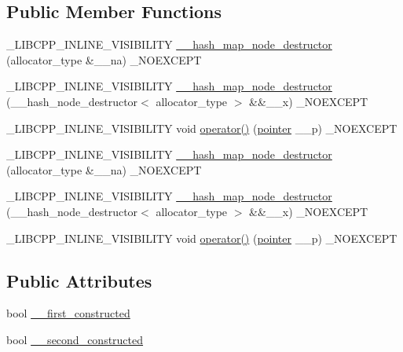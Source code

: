 \subsection*{Public Member Functions}
\begin{DoxyCompactItemize}
\item 
\+\_\+\+L\+I\+B\+C\+P\+P\+\_\+\+I\+N\+L\+I\+N\+E\+\_\+\+V\+I\+S\+I\+B\+I\+L\+I\+T\+Y \hyperlink{class____hash__map__node__destructor_ae769d8f8dd5d8206256a8da948c70246}{\+\_\+\+\_\+hash\+\_\+map\+\_\+node\+\_\+destructor} (allocator\+\_\+type \&\+\_\+\+\_\+na) \+\_\+\+N\+O\+E\+X\+C\+E\+P\+T
\item 
\+\_\+\+L\+I\+B\+C\+P\+P\+\_\+\+I\+N\+L\+I\+N\+E\+\_\+\+V\+I\+S\+I\+B\+I\+L\+I\+T\+Y \hyperlink{class____hash__map__node__destructor_ae34ea0c4c78b256cabbb8a0cf70cddd9}{\+\_\+\+\_\+hash\+\_\+map\+\_\+node\+\_\+destructor} (\+\_\+\+\_\+hash\+\_\+node\+\_\+destructor$<$ allocator\+\_\+type $>$ \&\&\+\_\+\+\_\+x) \+\_\+\+N\+O\+E\+X\+C\+E\+P\+T
\item 
\+\_\+\+L\+I\+B\+C\+P\+P\+\_\+\+I\+N\+L\+I\+N\+E\+\_\+\+V\+I\+S\+I\+B\+I\+L\+I\+T\+Y void \hyperlink{class____hash__map__node__destructor_a000375b0a0b2f469818005bea5db02ee}{operator()} (\hyperlink{class____hash__map__node__destructor_a17f355285c7ac0618f1acb9b8a886890}{pointer} \+\_\+\+\_\+p) \+\_\+\+N\+O\+E\+X\+C\+E\+P\+T
\item 
\+\_\+\+L\+I\+B\+C\+P\+P\+\_\+\+I\+N\+L\+I\+N\+E\+\_\+\+V\+I\+S\+I\+B\+I\+L\+I\+T\+Y \hyperlink{class____hash__map__node__destructor_ae769d8f8dd5d8206256a8da948c70246}{\+\_\+\+\_\+hash\+\_\+map\+\_\+node\+\_\+destructor} (allocator\+\_\+type \&\+\_\+\+\_\+na) \+\_\+\+N\+O\+E\+X\+C\+E\+P\+T
\item 
\+\_\+\+L\+I\+B\+C\+P\+P\+\_\+\+I\+N\+L\+I\+N\+E\+\_\+\+V\+I\+S\+I\+B\+I\+L\+I\+T\+Y \hyperlink{class____hash__map__node__destructor_ae34ea0c4c78b256cabbb8a0cf70cddd9}{\+\_\+\+\_\+hash\+\_\+map\+\_\+node\+\_\+destructor} (\+\_\+\+\_\+hash\+\_\+node\+\_\+destructor$<$ allocator\+\_\+type $>$ \&\&\+\_\+\+\_\+x) \+\_\+\+N\+O\+E\+X\+C\+E\+P\+T
\item 
\+\_\+\+L\+I\+B\+C\+P\+P\+\_\+\+I\+N\+L\+I\+N\+E\+\_\+\+V\+I\+S\+I\+B\+I\+L\+I\+T\+Y void \hyperlink{class____hash__map__node__destructor_a000375b0a0b2f469818005bea5db02ee}{operator()} (\hyperlink{class____hash__map__node__destructor_a17f355285c7ac0618f1acb9b8a886890}{pointer} \+\_\+\+\_\+p) \+\_\+\+N\+O\+E\+X\+C\+E\+P\+T
\end{DoxyCompactItemize}
\subsection*{Public Attributes}
\begin{DoxyCompactItemize}
\item 
bool \hyperlink{class____hash__map__node__destructor_aca6510f2ab38d2127b39e734f98114bd}{\+\_\+\+\_\+first\+\_\+constructed}
\item 
bool \hyperlink{class____hash__map__node__destructor_adf3d560f8a42d9f2afa1d8805152adcf}{\+\_\+\+\_\+second\+\_\+constructed}
\end{DoxyCompactItemize}


